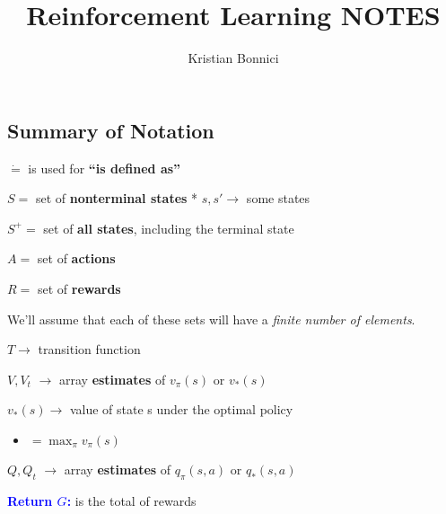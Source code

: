 \documentclass[12pt, a4paper]{article}
\title{Reinforcement Learning NOTES}
\author{Kristian Bonnici}
\begin{document}
\maketitle
\tableofcontents

\newpage
\subsection{Summary of Notation}\label{summary-of-notation}

\(\dot{=}\) is used for \textbf{``is defined as''}

\(S =\) set of \textbf{nonterminal states} * \(s, s' \rightarrow\) some
states

\(S^+ =\) set of \textbf{all states}, including the terminal state

\(A =\) set of \textbf{actions}

\(R =\) set of \textbf{rewards}

We'll assume that each of these sets will have a \emph{finite number of
elements}.

\(T \rightarrow\) transition function

\(V, V_t\) \(\rightarrow\) array \textbf{estimates} of
\(v_\pi(s)\) or \(v_*(s)\)

\(v_*(s) \rightarrow\) value of state s under the optimal policy
\begin{itemize}
  \item $= \max_\pi v_\pi(s)$
\end{itemize}

\(Q, Q_t\) \(\rightarrow\) array \textbf{estimates} of
\(q_\pi(s,a)\) or \(q_*(s,a)\)



\textcolor{blue}{\textbf{Return $G$:}} is the total of rewards
\end{document}
